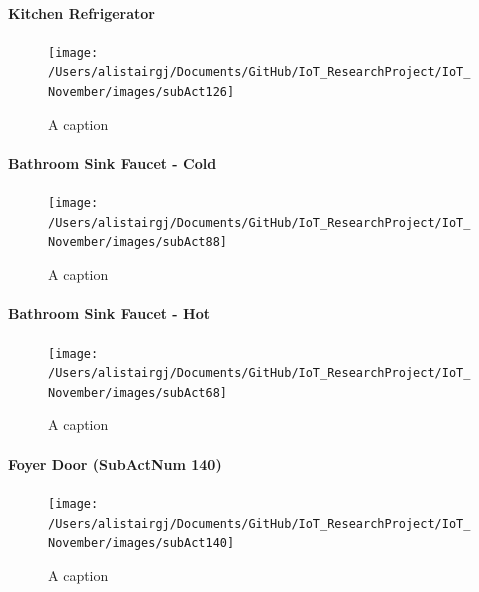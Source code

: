 \documentclass[11pt,]{article}
\let\oldparagraph\paragraph
\renewcommand{\paragraph}[1]{\oldparagraph{#1}\mbox{}}
\begin{document}
\hypertarget{kitchen-refrigerator}{%
\paragraph{Kitchen Refrigerator}\label{kitchen-refrigerator}}

\begin{figure}[H]

{\centering \texttt{[image: /Users/alistairgj/Documents/GitHub/IoT\_ResearchProject/IoT\_November/images/subAct126]} 

}

\caption{A caption}\label{fig:subAct126}
\end{figure}

\hypertarget{bathroom-sink-faucet---cold}{%
\paragraph{Bathroom Sink Faucet -
Cold}\label{bathroom-sink-faucet---cold}}

\begin{figure}[H]

{\centering \texttt{[image: /Users/alistairgj/Documents/GitHub/IoT\_ResearchProject/IoT\_November/images/subAct88]} 

}

\caption{A caption}\label{fig:subAct88}
\end{figure}

\hypertarget{bathroom-sink-faucet---hot}{%
\paragraph{Bathroom Sink Faucet -
Hot}\label{bathroom-sink-faucet---hot}}

\begin{figure}[H]

{\centering \texttt{[image: /Users/alistairgj/Documents/GitHub/IoT\_ResearchProject/IoT\_November/images/subAct68]} 

}

\caption{A caption}\label{fig:subAct68}
\end{figure}

\hypertarget{foyer-door-subactnum-140}{%
\paragraph{Foyer Door (SubActNum 140)}\label{foyer-door-subactnum-140}}

\begin{figure}[H]

{\centering \texttt{[image: /Users/alistairgj/Documents/GitHub/IoT\_ResearchProject/IoT\_November/images/subAct140]} 

}

\caption{A caption}\label{fig:subAct140}
\end{figure}
\end{document}
